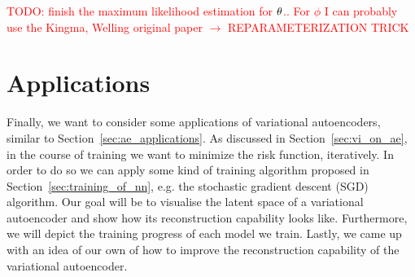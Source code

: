 \textcolor{red}{TODO: finish the maximum likelihood estimation for $\theta$.. For $\phi$ I can probably use the Kingma, Welling original paper $\to$ REPARAMETERIZATION TRICK}


\section{Applications}\label{sec:vae_applications}

Finally, we want to consider some applications of variational autoencoders, similar to Section~\ref{sec:ae_applications}. As discussed in Section~\ref{sec:vi_on_ae}, in the course of training we want to minimize the risk function, iteratively. In order to do so we can apply some kind of training algorithm proposed in Section~\ref{sec:training_of_nn}, e.g. the stochastic gradient descent (SGD) algorithm. Our goal will be to visualise the latent space of a variational autoencoder and show how its reconstruction capability looks like. Furthermore, we will depict the training progress of each model we train. Lastly, we came up with an idea of our own of how to improve the reconstruction capability of the variational autoencoder.
